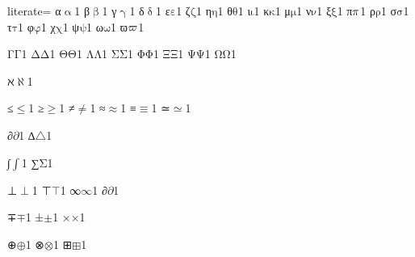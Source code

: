 {%
literate=
{α}{{\ensuremath{\mathrm{\upalpha}}}}1
{β}{{\ensuremath{\mathrm{\upbeta}}}}1
{γ}{{\ensuremath{\mathrm{\upgamma}}}}1
{δ}{{\ensuremath{\mathrm{\updelta}}}}1
{ε}{{\ensuremath{\mathrm{\varepsilon}}}}1
{ζ}{{\ensuremath{\mathrm{\zeta}}}}1
{η}{{\ensuremath{\mathrm{\eta}}}}1
{θ}{{\ensuremath{\mathrm{\theta}}}}1
{ι}{{\ensuremath{\mathrm{\iota}}}}1
{κ}{{\ensuremath{\mathrm{\kappa}}}}1
{μ}{{\ensuremath{\mathrm{\mu}}}}1
{ν}{{\ensuremath{\mathrm{\nu}}}}1
{ξ}{{\ensuremath{\mathrm{\xi}}}}1
{π}{{\ensuremath{\mathrm{\mathnormal{\pi}}}}}1
{ρ}{{\ensuremath{\mathrm{\rho}}}}1
{σ}{{\ensuremath{\mathrm{\sigma}}}}1
{τ}{{\ensuremath{\mathrm{\tau}}}}1
{φ}{{\ensuremath{\mathrm{\varphi}}}}1
{χ}{{\ensuremath{\mathrm{\chi}}}}1
{ψ}{{\ensuremath{\mathrm{\psi}}}}1
{ω}{{\ensuremath{\mathrm{\omega}}}}1
{ϖ}{{\ensuremath{\mathrm{\mathnormal{\varpi}}}}}1 %

{Γ}{{\ensuremath{\mathrm{\Gamma}}}}1
{Δ}{{\ensuremath{\mathrm{\Delta}}}}1
{Θ}{{\ensuremath{\mathrm{\Theta}}}}1
{Λ}{{\ensuremath{\mathrm{\Lambda}}}}1
{Σ}{{\ensuremath{\mathrm{\Sigma}}}}1
{Φ}{{\ensuremath{\mathrm{\Phi}}}}1
{Ξ}{{\ensuremath{\mathrm{\Xi}}}}1
{Ψ}{{\ensuremath{\mathrm{\Psi}}}}1
{Ω}{{\ensuremath{\mathrm{\Omega}}}}1

{ℵ}{{\ensuremath{\aleph}}}1

{≤}{{\color{symbolcolor}\ensuremath{\leq}}}1
{≥}{{\color{symbolcolor}\ensuremath{\geq}}}1
{≠}{{\color{symbolcolor}\ensuremath{\neq}}}1
{≈}{{\color{symbolcolor}\ensuremath{\approx}}}1
{≡}{{\color{symbolcolor}\ensuremath{\equiv}}}1
{≃}{{\color{symbolcolor}\ensuremath{\simeq}}}1

{∂}{{\color{symbolcolor}\ensuremath{\partial}}}1
{∆}{{\color{symbolcolor}\ensuremath{\triangle}}}1 %

{∫}{{\color{symbolcolor}\ensuremath{\int}}}1
{∑}{{\color{symbolcolor}\ensuremath{\mathrm{\Sigma}}}}1

{⊥}{{\color{symbolcolor}\ensuremath{\perp}}}1
{⊤}{{\color{symbolcolor}\ensuremath{\top}}}1
{∞}{{\color{symbolcolor}\ensuremath{\infty}}}1
{∂}{{\color{symbolcolor}\ensuremath{\partial}}}1

{∓}{{\color{symbolcolor}\ensuremath{\mp}}}1
{±}{{\color{symbolcolor}\ensuremath{\pm}}}1
{×}{{\color{symbolcolor}\ensuremath{\times}}}1

{⊕}{{\color{symbolcolor}\ensuremath{\oplus}}}1
{⊗}{{\color{symbolcolor}\ensuremath{\otimes}}}1
{⊞}{{\color{symbolcolor}\ensuremath{\boxplus}}}1

}

